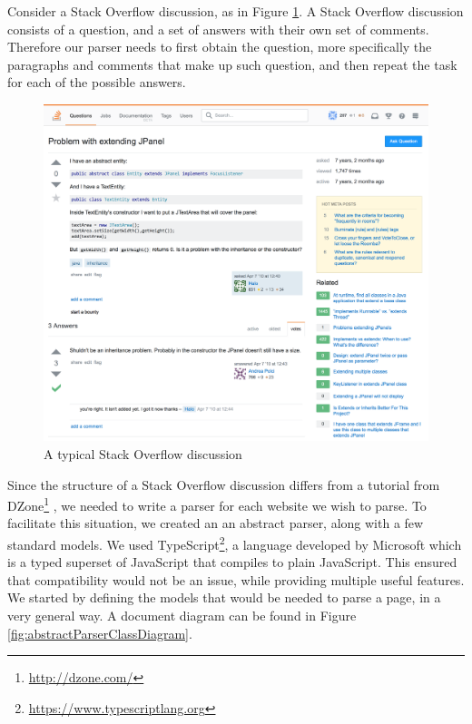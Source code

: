 Consider a Stack Overflow discussion, as in Figure \ref{fig:soConv}. A Stack Overflow discussion consists of a question, and a set of answers with their own set of comments. Therefore our parser needs to first obtain the question, more specifically the paragraphs and comments that make up such question, and then repeat the task for each of the possible answers. 

\begin{figure}[H]
\centering
\includegraphics[scale=0.3]{Figures/SOConv}
\caption{A typical Stack Overflow discussion}
\label{fig:soConv}
\end{figure}

Since the structure of a Stack Overflow discussion differs from a tutorial from DZone\footnote{\url{http://dzone.com/}} , we needed to write a parser for each website we wish to parse. To facilitate this situation, we created an an abstract parser, along with a few standard models. We used TypeScript\footnote{\url{https://www.typescriptlang.org}}, a language developed by Microsoft which is a typed superset of JavaScript that compiles to plain JavaScript. This ensured that compatibility would not be an issue, while providing multiple useful features. We started by defining the models that would be needed to parse a page, in a very general way. A document diagram can be found in Figure \ref{fig:abstractParserClassDiagram}.

